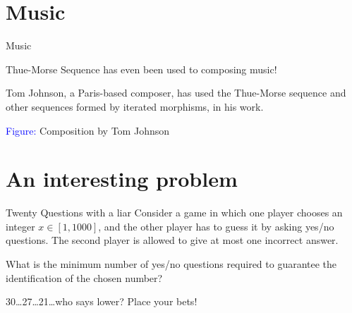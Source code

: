 \documentclass{beamer}
\begin{document}
\section{Music}

\begin{frame}{Music}

    Thue-Morse Sequence has even been used to composing music! 

    \vspace{0.5cm}

    Tom Johnson, a Paris-based composer, has used the Thue-Morse
    sequence and other sequences formed by iterated morphisms, in his
    work.

    \vspace{0.5cm}

    \begin{center}
    
    \vspace{0.5em}
    \textcolor{blue}{Figure:} Composition by Tom Johnson

    \end{center}
    
\end{frame}


\section{An interesting problem}

\begin{frame}{Twenty Questions with a liar}
    Consider a game in which one player chooses an integer \( x \in [1, 1000] \), and the other player has to guess it by asking yes/no questions. The second player is allowed to give at most one incorrect answer.
    \newline
    
    What is the minimum number of yes/no questions required to guarantee the identification of the chosen number?
    \newline

    30\dots 27\dots 21\dots who says lower? Place your bets!
\end{frame}
\end{document}
